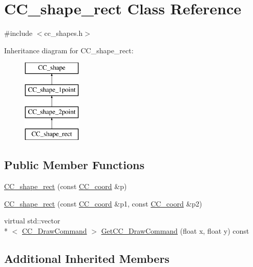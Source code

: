 \hypertarget{a00044}{\section{C\-C\-\_\-shape\-\_\-rect Class Reference}
\label{a00044}
}


{\ttfamily \#include $<$cc\-\_\-shapes.\-h$>$}

Inheritance diagram for C\-C\-\_\-shape\-\_\-rect\-:\begin{figure}[H]
\begin{center}
\leavevmode
\includegraphics[height=4.000000cm]{a00044}
\end{center}
\end{figure}
\subsection*{Public Member Functions}
\begin{DoxyCompactItemize}
\item 
\hyperlink{a00044_af9b84c1d79e5fbe35cd14cc767978878}{C\-C\-\_\-shape\-\_\-rect} (const \hyperlink{a00029}{C\-C\-\_\-coord} \&p)
\item 
\hyperlink{a00044_a85eb247e35de03b622d4787a264be252}{C\-C\-\_\-shape\-\_\-rect} (const \hyperlink{a00029}{C\-C\-\_\-coord} \&p1, const \hyperlink{a00029}{C\-C\-\_\-coord} \&p2)
\item 
virtual std\-::vector\\*
$<$ \hyperlink{a00031}{C\-C\-\_\-\-Draw\-Command} $>$ \hyperlink{a00044_aca56590bb687ba94ce96b0c0e66116f7}{Get\-C\-C\-\_\-\-Draw\-Command} (float x, float y) const 
\end{DoxyCompactItemize}
\subsection*{Additional Inherited Members}


